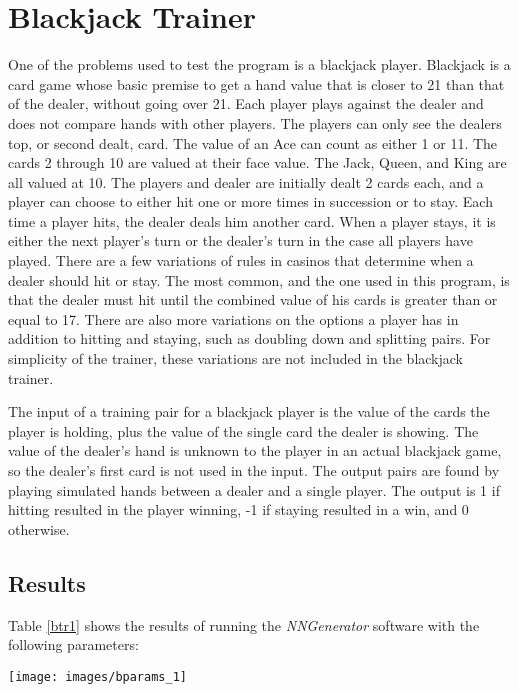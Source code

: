 \chapter[Blackjack Trainer]{Blackjack Trainer}
One of the problems used to test the program is a blackjack player. 
Blackjack is a card game whose basic premise to get a hand value that is closer to 21 than that of the dealer, without going over 21. 
Each player plays against the dealer and does not compare hands with other players. 
The players can only see the dealers top, or second dealt, card. 
The value of an Ace can count as either 1 or 11. 
The cards 2 through 10 are valued at their face value. 
The Jack, Queen, and King are all valued at 10. 
The players and dealer are initially dealt 2 cards each, and a player can choose to either hit one or more times in succession or to stay. 
Each time a player hits, the dealer deals him another card. 
When a player stays, it is either the next player's turn or the dealer's turn in the case all players have played. 
There are a few variations of rules in casinos that determine when a dealer should hit or stay. 
The most common, and the one used in this program, is that the dealer must hit until the combined value of his cards is greater than or equal to 17. 
There are also more variations on the options a player has in addition to hitting and staying, such as doubling down and splitting pairs. 
For simplicity of the trainer, these variations are not included in the blackjack trainer.

The input of a training pair for a blackjack player is the value of the cards the player is holding, plus the value of the single card the dealer is showing. 
The value of the dealer's hand is unknown to the player in an actual blackjack game, so the dealer's first card is not used in the input. 
The output pairs are found by playing simulated hands between a dealer and a single player. 
The output is 1 if hitting resulted in the player winning, -1 if staying resulted in a win, and 0 otherwise.

\section{Results}

Table \ref{btr1} shows the results of running the {\it NNGenerator} software with the following parameters:

\begin{center}
\texttt{[image: images/bparams\_1]}
\end{center}


